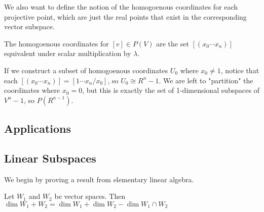 \documentclass[10pt]{article}
\begin{document}
We also want to define the notion of the homogoenous coordinates for each
projective point, which are just the real points that exist in the
corresponding vector subspace.

\begin{definition}
	The homogoenous coordinates for $[v] \in P(V)$ are the set $[(x_0 \cdots x_n)]$ equivalent under scalar multiplication by $\lambda$.
\end{definition}

If we construct a subset of homogoenous coordinates $U_0$ where $x_0 \neq 1$,
notice that each $[(x_0 \cdots x_n)] = [1 \cdots x_n / x_0]$, so $U_0 \cong
R^n-1$. We are left to "partition" the coordinates where $x_0 = 0$, but this is
exactly the set of 1-dimensional subspaces of $V^n-1$, so $P(R^{n-1})$.

\subsection{Applications}


\subsection{Linear Subspaces}

We begin by proving a result from elementary linear algebra.

\begin{theorem}
	Let $W_1$ and $W_2$ be vector spaces. Then $\dim W_1 + W_2 = \dim W_1 + \dim W_2 - \dim W_1 \cap W_2$ 
\end{theorem}
\end{document}
